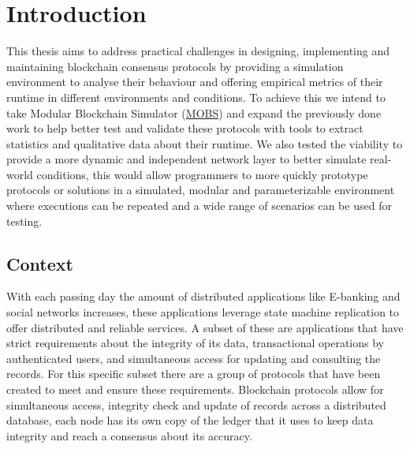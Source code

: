
%

\chapter{Introduction}\label{cha:introduction}

This thesis aims to address practical challenges in designing, implementing and maintaining blockchain consensus
protocols by providing a simulation environment to analyse their behaviour and offering empirical metrics of their runtime in
different environments and conditions. To achieve this we intend to take Modular Blockchain Simulator (\href{https://github.com/mce-alves/MOBS
}{MOBS}) and expand the previously done work to help better test and validate these protocols with tools to extract statistics and 
qualitative data about their runtime. We also tested the viability to provide a more dynamic and independent network layer
to better simulate real-world conditions, this would allow programmers to more quickly prototype protocols or solutions
in a simulated, modular and parameterizable environment where executions can be repeated and a wide range of scenarios
can be used for testing.


\section{Context}\label{sub:context}
With each passing day the amount of distributed applications like E-banking and social networks increases, these applications
leverage state machine replication to offer distributed and reliable services. A subset of these are applications
that have strict requirements about the integrity of its data, transactional operations by authenticated users, 
and simultaneous access for updating and
consulting the records. For this specific subset there are a group of protocols that have been created to meet and ensure
these requirements. Blockchain protocols allow for simultaneous access, integrity check and update of records across
a distributed database, each node has its own copy of the ledger that it uses to keep data integrity and reach a consensus
about its accuracy.

